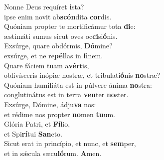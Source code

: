 \evenverse Nonne Deus requíret \textbf{i}sta?~\*\\
\evenverse ipse enim novit ab\textbf{scón}dita \textbf{cor}dis.\\
\oddverse Quóniam propter te mortificámur tota \textbf{di}e:~\*\\
\oddverse æstimáti sumus sicut oves oc\textbf{ci}si\textbf{ó}nis.\\
\evenverse Exsúrge, quare obdórmis, \textbf{Dó}mine?~\*\\
\evenverse exsúrge, et ne re\textbf{pél}las in \textbf{fi}nem.\\
\oddverse Quare fáciem tuam a\textbf{vér}tis,~\*\\
\oddverse oblivísceris inópiæ nostræ, et tribulati\textbf{ó}nis \textbf{no}stræ?\\
\evenverse Quóniam humiliáta est in púlvere ánima \textbf{no}stra:~\*\\
\evenverse conglutinátus est in terra \textbf{ven}ter \textbf{no}ster.\\
\oddverse Exsúrge, Dómine, ádju\textbf{va} nos:~\*\\
\oddverse et rédime nos propter \textbf{no}men \textbf{tu}um.\\
\evenverse Glória Patri, et \textbf{Fí}lio,~\*\\
\evenverse et Spi\textbf{rí}tui \textbf{San}cto.\\
\oddverse Sicut erat in princípio, et nunc, et \textbf{sem}per,~\*\\
\oddverse et in sǽcula sæcu\textbf{ló}rum. \textbf{A}men.\\
